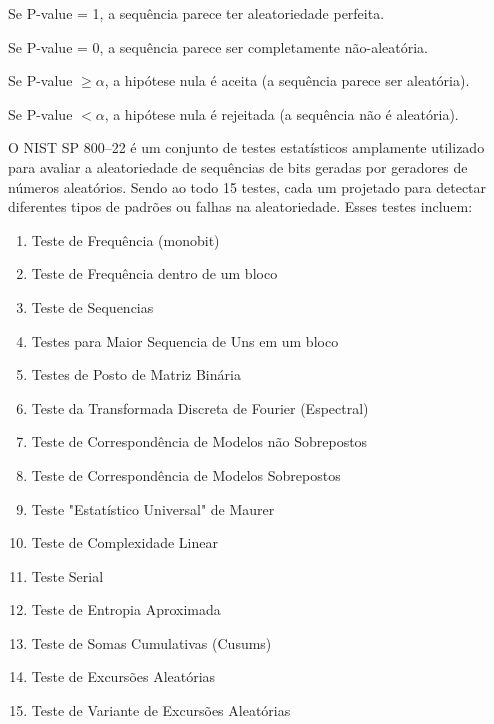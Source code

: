         Se P-value = 1, a sequência parece ter aleatoriedade perfeita.
        
        Se P-value = 0, a sequência parece ser completamente não-aleatória.
        
        Se P-value $\geq \alpha$, a hipótese nula é aceita (a sequência parece ser aleatória).
        
        Se P-value $< \alpha$, a hipótese nula é rejeitada (a sequência não é aleatória).

        O NIST SP 800--22 é um conjunto de testes estatísticos amplamente utilizado para avaliar a aleatoriedade de sequências de bits geradas por geradores de números aleatórios. 
        Sendo ao todo 15 testes, cada um projetado para detectar diferentes tipos de padrões ou falhas na aleatoriedade. Esses testes incluem:
         \begin{enumerate}
          \item Teste de Frequência (monobit)
          \item Teste de Frequência dentro de um bloco
          \item Teste de Sequencias
          \item Testes para Maior Sequencia de Uns em um bloco
          \item Testes de Posto de Matriz Binária
          \item Teste da Transformada Discreta de Fourier (Espectral)
          \item Teste de Correspondência de Modelos não Sobrepostos
          \item Teste de Correspondência de Modelos Sobrepostos
          \item Teste "Estatístico Universal" de Maurer
          \item Teste de Complexidade Linear
          \item Teste Serial
          \item Teste de Entropia Aproximada
          \item Teste de Somas Cumulativas (Cusums)
          \item Teste de Excursões Aleatórias
          \item Teste de Variante de Excursões Aleatórias
        \end{enumerate}%

        